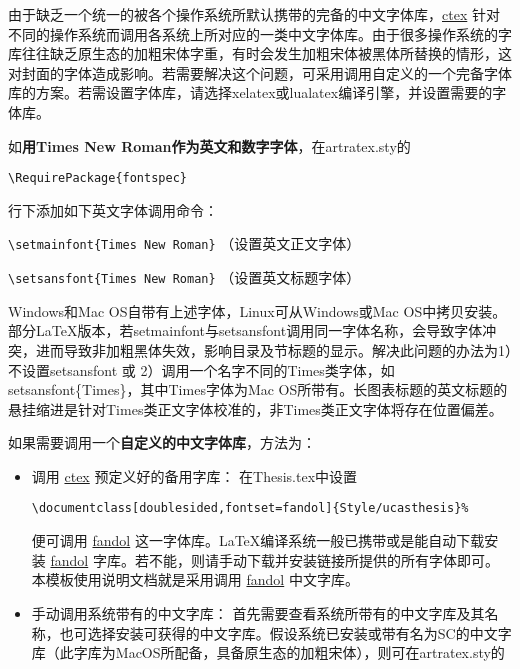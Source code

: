 \begin{enumerate}
        由于缺乏一个统一的被各个操作系统所默认携带的完备的中文字体库，\href{https://ctan.org/pkg/ctex?lang=en}{ctex} 针对不同的操作系统而调用各系统上所对应的一类中文字体库。由于很多操作系统的字库往往缺乏原生态的加粗宋体字重，有时会发生加粗宋体被黑体所替换的情形，这对封面的字体造成影响。若需要解决这个问题，可采用调用自定义的一个完备字体库的方案。若需设置字体库，请选择xelatex或lualatex编译引擎，并设置需要的字体库。
        
        如\textbf{用Times New Roman作为英文和数字字体}，在artratex.sty的

        \verb|\RequirePackage{fontspec}|

        行下添加如下英文字体调用命令：

        \verb|\setmainfont{Times New Roman}| （设置英文正文字体）

        \verb|\setsansfont{Times New Roman}| （设置英文标题字体）

        Windows和Mac OS自带有上述字体，Linux可从Windows或Mac OS中拷贝安装。部分\LaTeX{}版本，若setmainfont与setsansfont调用同一字体名称，会导致字体冲突，进而导致非加粗黑体失效，影响目录及节标题的显示。解决此问题的办法为1）不设置setsansfont 或 2）调用一个名字不同的Times类字体，如setsansfont\{Times\}，其中Times字体为Mac OS所带有。长图表标题的英文标题的悬挂缩进是针对Times类正文字体校准的，非Times类正文字体将存在位置偏差。
                 
        如果需要调用一个\textbf{自定义的中文字体库}，方法为：

        \begin{itemize}
            \item 调用 \href{https://ctan.org/pkg/ctex?lang=en}{ctex} 预定义好的备用字库： 在Thesis.tex中设置

                {
                    \small\verb|\documentclass[doublesided,fontset=fandol]{Style/ucasthesis}%|
                }

                便可调用 \href{https://ctan.org/tex-archive/fonts/fandol?lang=en}{fandol} 这一字体库。\LaTeX{}编译系统一般已携带或是能自动下载安装 \href{https://ctan.org/tex-archive/fonts/fandol?lang=en}{fandol} 字库。若不能，则请手动下载并安装链接所提供的所有字体即可。本模板使用说明文档就是采用调用 \href{https://ctan.org/tex-archive/fonts/fandol?lang=en}{fandol} 中文字库。

            \item 手动调用系统带有的中文字库： 首先需要查看系统所带有的中文字库及其名称，也可选择安装可获得的中文字库。假设系统已安装或带有名为SC的中文字库（此字库为MacOS所配备，具备原生态的加粗宋体），则可在artratex.sty的


\end{itemize}
\end{enumerate}
